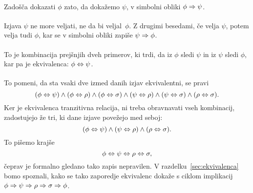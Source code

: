 \paragraph{}
%
Zadošča dokazati $\phi$ zato, da dokažemo $\psi$, v simbolni obliki $\phi \Rightarrow \psi$.

\paragraph{}
%
Izjava $\psi$ ne more veljati, ne da bi veljal~$\phi$. Z drugimi
besedami, če velja $\psi$, potem velja tudi $\phi$, kar se v simbolni obliki
zapiše $\psi \Rightarrow \phi$.

\paragraph{}
%
To je kombinacija prejšnjih dveh primerov, ki trdi, da iz $\phi$ sledi
$\psi$ in iz $\psi$ sledi $\phi$, kar pa je ekvivalenca:
%
$\phi \Leftrightarrow \psi$.

\paragraph{}
%
To pomeni, da sta vsaki dve izmed danih izjav ekvivalentni, se pravi
%
\begin{equation*}
  (\phi \Leftrightarrow \psi) \land (\phi \Leftrightarrow \rho) \land (\phi \Leftrightarrow \sigma) \land (\psi \Leftrightarrow \rho)
  \land (\psi \Leftrightarrow \sigma) \land (\rho \Leftrightarrow \sigma).
\end{equation*}
%
Ker je ekvivalenca tranzitivna relacija, ni treba obravnavati vseh
kombinacij, zadostujejo že tri, ki dane izjave povežejo med seboj:
%
\begin{equation*}
  (\phi \Leftrightarrow \psi) \land (\psi \Leftrightarrow \rho) \land (\rho \Leftrightarrow \sigma).
\end{equation*}
%
To pišemo krajše
%
\begin{equation*}
  \phi \Leftrightarrow \psi \Leftrightarrow \rho \Leftrightarrow \sigma,
\end{equation*}
%
čeprav je formalno gledano tako zapis nepravilen. V
razdelku~\ref{sec:ekvivalenca} bomo spoznali, kako se tako zaporedje
ekvivalenc dokaže s ciklom implikacij $\phi \Rightarrow \psi \Rightarrow \rho
\Rightarrow \sigma \Rightarrow \phi$.

